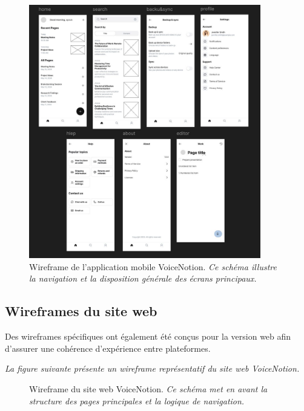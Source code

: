     \begin{figure}[htbp]
        \centering
        \includegraphics[width=0.9\textwidth]{assets/docs/mobile/wireframe_app-2.jpg}
        \caption{Wireframe de l'application mobile VoiceNotion. \newline\textit{Ce schéma illustre la navigation et la disposition générale des écrans principaux.}}
        \label{fig:wireframe_app_main}
    \end{figure}
    
    \subsection{Wireframes du site web}
    
    Des wireframes spécifiques ont également été conçus pour la version web afin d'assurer une cohérence d'expérience entre plateformes.
    
        \textit{La figure suivante présente un wireframe représentatif du site web VoiceNotion.}
    \begin{figure}[htbp]
        \centering
        \caption{Wireframe du site web VoiceNotion. \newline\textit{Ce schéma met en avant la structure des pages principales et la logique de navigation.}}
        \label{fig:wireframe_web}
    \end{figure}
    
